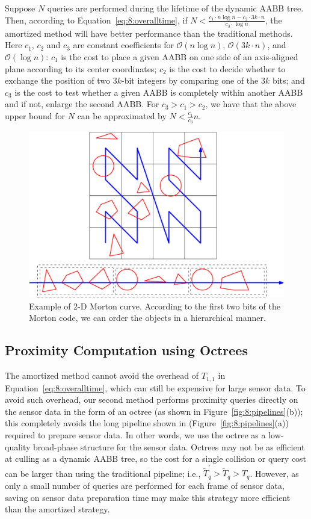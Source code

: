 Suppose $N$ queries are performed during the lifetime of the dynamic
AABB tree. Then, according to Equation~\ref{eq:8:overalltime},
if $N < \frac{c_1 \cdot n \log n - c_2 \cdot 3 k \cdot n}{c_3 \cdot \log n}$, the amortized method will have better
performance than the traditional methods. Here $c_1$, $c_2$ and $c_3$ are constant coefficients for $\mathcal O(n\log n)$, $\mathcal O(3k \cdot n)$, and $\mathcal O(\log n)$: $c_1$ is the cost to place a given AABB on one side of an axis-aligned plane according to its center coordinates; $c_2$ is the cost to decide whether to exchange the position of two $3k$-bit integers by comparing one of the $3k$ bits; and $c_3$ is the cost to test whether a given AABB is completely within another AABB and if not, enlarge the second AABB. For $c_3 > c_1 > c_2$, we have that the above upper bound for $N$ can be approximated by $N < \frac{c_1}{c_3} n$.

\begin{figure}[!htbp]
\centering
\includegraphics[width=0.8\linewidth]{figs/8/morton.pdf}
\caption[Illustration of 2-D Morton curve]{\label{fig:8:morton} Example of 2-D Morton curve. According to the first two
bits of the Morton code, we can order the objects in a hierarchical manner.}
\end{figure}


\subsection{Proximity Computation using Octrees}
The amortized method cannot avoid the overhead of $T_{1,1}$ in Equation~\ref{eq:8:overalltime}, which can still be expensive for large sensor data.
To avoid such overhead, our second method
performs proximity queries directly on the sensor data in
the form of an octree (as shown in Figure~\ref{fig:8:pipelines}(b)); this completely avoids the long pipeline shown in (Figure~\ref{fig:8:pipelines}(a)) required to prepare sensor
data. In other words, we use the octree as a low-quality broad-phase
structure for the sensor data. Octrees may not be as efficient at
culling as a dynamic AABB tree, so the cost for a single collision or
query cost can be larger than using the traditional pipeline; i.e.,
$\widetilde{T}_q^\prime > \widetilde{T}_q > T_q$. However, as
only a small number of queries are performed for each frame of sensor
data, saving on sensor data preparation time may make this
strategy more efficient than the amortized strategy.




